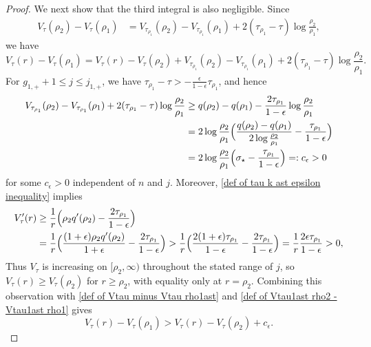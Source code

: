 \documentclass[10pt,a4paper]{amsart}
\begin{document}
\begin{proof}
We next show that the third integral is also negligible. Since
\begin{align*}
V_{\tau}(\rho_2)-V_{\tau}(\rho_1)
&=V_{\tau_{\rho_1}}(\rho_2)-V_{\tau_{\rho_1}}(\rho_1)+2(\tau_{\rho_1}-\tau)\log \frac{\rho_2}{\rho_1},
\end{align*}
we have 
\begin{equation}
\label{def of Vtau minus Vtau rho1ast}
V_{\tau}(r)-V_{\tau}(\rho_1) 
=
V_{\tau}(r)-V_{\tau}(\rho_2)
+
V_{\tau_{\rho_1}}(\rho_2)-V_{\tau_{\rho_1}}(\rho_1)+2(\tau_{\rho_1}-\tau)\log \frac{\rho_2}{\rho_1}.
\end{equation}
For $g_{1,+}+1\leq j\leq j_{1,+}$, we have $\tau_{\rho_1}-\tau>-\frac{\epsilon}{1-\epsilon}\tau_{\rho_1}$,
and hence
\begin{align}
    \begin{split}
\label{def of Vtau1ast rho2 - Vtau1ast rho1}
V_{\tau_{\rho_1}}(\rho_2)-V_{\tau_{\rho_1}}(\rho_1)+2(\tau_{\rho_1}-\tau)\log\frac{\rho_2}{\rho_1}
&\geq q(\rho_2)-q(\rho_1)-\frac{2\tau_{\rho_1}}{1-\epsilon}\log\frac{\rho_2}{\rho_1}
\\
&=
2\log\frac{\rho_2}{\rho_1}
\Bigl(\frac{q(\rho_2)-q(\rho_1)}{2\log\frac{\rho_2}{\rho_1}}-\frac{\tau_{\rho_1}}{1-\epsilon}\Bigr)
\\
&=2\log\frac{\rho_2}{\rho_1}
\Bigl(\sigma_{\star}-\frac{\tau_{\rho_1}}{1-\epsilon}\Bigr)
=:c_{\epsilon}>0
    \end{split}
\end{align}
for some $c_\epsilon>0$ independent of $n$ and $j$. Moreover, \eqref{def of tau k ast epsilon inequality} implies
\begin{align*}
 V_{\tau}'(r)&\geq \frac{1}{r}\Bigl(\rho_2q'(\rho_2)-\frac{2\tau_{\rho_1}}{1-\epsilon}\Bigr)
 \\
 &=
 \frac{1}{r}\Bigl(\frac{(1+\epsilon)\rho_2q'(\rho_2)}{1+\epsilon}-\frac{2\tau_{\rho_1}}{1-\epsilon}\Bigr)
 >\frac{1}{r}\Bigl(\frac{2(1+\epsilon)\tau_{\rho_1}}{1-\epsilon}-\frac{2\tau_{\rho_1}}{1-\epsilon}\Bigr)=\frac{1}{r}\frac{2\epsilon\tau_{\rho_1}}{1-\epsilon}>0,
\end{align*}
Thus $V_\tau$ is increasing on $[\rho_2,\infty)$ throughout the stated range of $j$, so $V_\tau(r)\geq V_\tau(\rho_2)$ for $r\geq\rho_2$, with equality only at $r=\rho_2$. Combining this observation with \eqref{def of Vtau minus Vtau rho1ast} and \eqref{def of Vtau1ast rho2 - Vtau1ast rho1} gives
\begin{equation}
\label{def of inequality Vtau r Vtau rho1ast}
    V_{\tau}(r)-V_{\tau}(\rho_1)>V_{\tau}(r)- V_{\tau}(\rho_2)+c_{\epsilon}.

\end{equation}
\end{proof}
\end{document}
